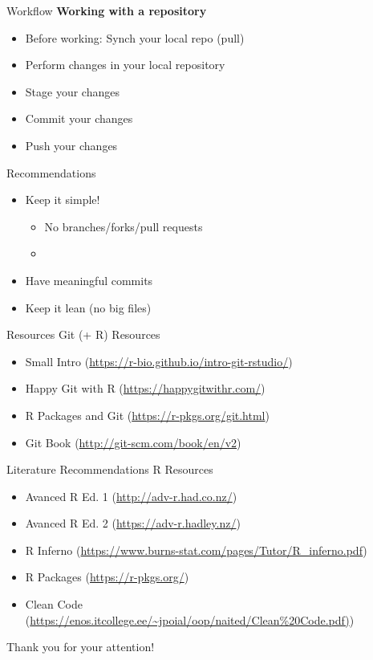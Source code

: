 \documentclass[xcolor=table]{beamer}\usepackage[]{graphicx}\usepackage[]{color}
\begin{document}
\begin{frame}{Workflow}
\textbf{Working with a repository}
\begin{itemize}
  \item Before working: Synch your local repo (pull)
  \item Perform changes in your local repository
  \item Stage your changes
  \item Commit your changes
  \item Push your changes
\end{itemize}
\end{frame}

\begin{frame}{Recommendations}
\begin{itemize}
  \item Keep it simple! 
  \begin{itemize}
    \item No branches/forks/pull requests
    \item 
  \end{itemize}
  \item Have meaningful commits
  \item Keep it lean (no big files)
\end{itemize}
\end{frame}

\begin{frame}{Resources}
Git (+ R) Resources
\begin{itemize}
\item Small Intro (\url{https://r-bio.github.io/intro-git-rstudio/})
\item Happy Git with R (\url{https://happygitwithr.com/})
\item R Packages and Git (\url{https://r-pkgs.org/git.html})
\item Git Book (\url{http://git-scm.com/book/en/v2})
\end{itemize}

\end{frame}

\begin{frame}{Literature Recommendations}
R Resources
\begin{itemize}
\item Avanced R Ed. 1 (\url{http://adv-r.had.co.nz/})
\item Avanced R Ed. 2 (\url{https://adv-r.hadley.nz/})
\item R Inferno (\url{https://www.burns-stat.com/pages/Tutor/R_inferno.pdf})
\item R Packages (\url{https://r-pkgs.org/})
\item Clean Code (\url{https://enos.itcollege.ee/~jpoial/oop/naited/Clean\%20Code.pdf)})
\end{itemize}

\end{frame}

\begin{frame}[plain]

\begin{center}
\Large Thank you for your attention!

\end{center}

\end{frame}
\end{document}
